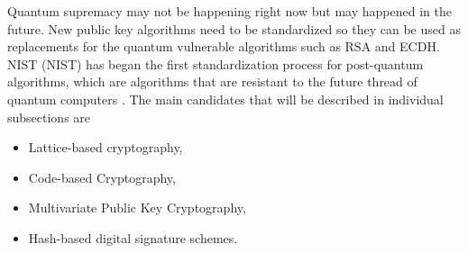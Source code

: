 Quantum supremacy may not be happening right now but may happened in the future. New public key algorithms need to be standardized so they can be used as replacements for the quantum vulnerable algorithms such as RSA and ECDH. NIST (\acl{NIST}) has began the first standardization process for post-quantum algorithms, which are algorithms that are resistant to the future thread of quantum computers \cite{Chen2016}. The main candidates that will be described  in individual subsections are
\begin{itemize}
  \item Lattice-based cryptography,
  \item Code-based Cryptography,
  \item Multivariate Public Key Cryptography,
  \item Hash-based digital signature schemes.
\end{itemize}

